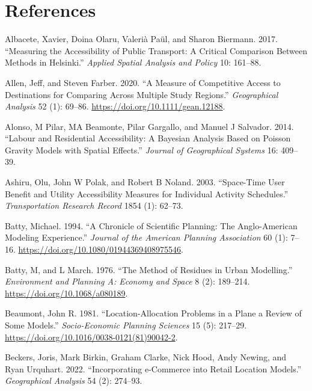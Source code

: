 \documentclass[
]{article}
\newlength{\cslhangindent}
\newenvironment{CSLReferences}[2] %
 {\begin{list}{}{%
  \setlength{\itemindent}{0pt}
  \setlength{\leftmargin}{0pt}
  \setlength{\parsep}{0pt}
  \ifodd #1
   \setlength{\leftmargin}{\cslhangindent}
   \setlength{\itemindent}{-1\cslhangindent}
  \fi
  \setlength{\itemsep}{#2\baselineskip}}}
 {\end{list}}
\begin{document}
\section{References}\label{references}

\label{refs}
\begin{CSLReferences}{1}{0}
Albacete, Xavier, Doina Olaru, Valerià Paül, and Sharon Biermann. 2017.
{``Measuring the Accessibility of Public Transport: A Critical
Comparison Between Methods in Helsinki.''} \emph{Applied Spatial
Analysis and Policy} 10: 161--88.

Allen, Jeff, and Steven Farber. 2020. {``A Measure of Competitive Access
to Destinations for Comparing Across Multiple Study Regions.''}
\emph{Geographical Analysis} 52 (1): 69--86.
\url{https://doi.org/10.1111/gean.12188}.

Alonso, M Pilar, MA Beamonte, Pilar Gargallo, and Manuel J Salvador.
2014. {``Labour and Residential Accessibility: A Bayesian Analysis Based
on Poisson Gravity Models with Spatial Effects.''} \emph{Journal of
Geographical Systems} 16: 409--39.

Ashiru, Olu, John W Polak, and Robert B Noland. 2003. {``Space-Time User
Benefit and Utility Accessibility Measures for Individual Activity
Schedules.''} \emph{Transportation Research Record} 1854 (1): 62--73.

Batty, Michael. 1994. {``A {Chronicle} of {Scientific} {Planning}: {The}
{Anglo}-{American} {Modeling} {Experience}.''} \emph{Journal of the
American Planning Association} 60 (1): 7--16.
\url{https://doi.org/10.1080/01944369408975546}.

Batty, M, and L March. 1976. {``The Method of Residues in Urban
Modelling.''} \emph{Environment and Planning A: Economy and Space} 8
(2): 189--214. \url{https://doi.org/10.1068/a080189}.

Beaumont, John R. 1981. {``Location-Allocation Problems in a Plane a
Review of Some Models.''} \emph{Socio-Economic Planning Sciences} 15
(5): 217--29. \url{https://doi.org/10.1016/0038-0121(81)90042-2}.

Beckers, Joris, Mark Birkin, Graham Clarke, Nick Hood, Andy Newing, and
Ryan Urquhart. 2022. {``Incorporating e-Commerce into Retail Location
Models.''} \emph{Geographical Analysis} 54 (2): 274--93.


\end{CSLReferences}
\end{document}
